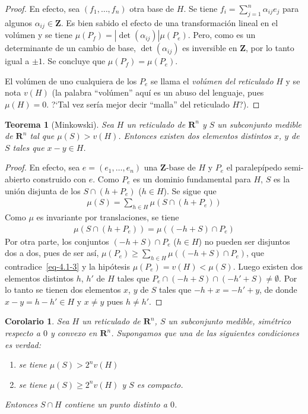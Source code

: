 \documentclass[10pt,oneside,bibtotoc,smallheadings,leqno,a5paper,DIV=12]{scrbook}
\newcommand{\RR}{\mathbf{R}}
\newcommand{\ZZ}{\mathbf{Z}}
\newcommand{\QED}{}%
\newcommand{\abs}[1]{\left\lvert#1\right\rvert}
\numberwithin{equation}{section}
\theoremstyle{defi}
\theoremstyle{enonce}
\newtheorem{theorem}{Teorema}
\newtheorem*{corollary*}{Corolario}
\theoremstyle{rem}
\numberwithin{theorem}{section}
\numberwithin{proposition}{section}
\numberwithin{definition}{section}
\numberwithin{lemma}{section}
\numberwithin{corollary}{section}
\numberwithin{example}{section}
\numberwithin{footnote}{section}%
\begin{document}
\begin{proof}
En efecto, sea $(f_{1},\dots,f_{n})$ otra base de $H$. Se tiene
$f_{i} = \sum_{j=1}^{n}\alpha_{ij}e_{j}$
para algunos $\alpha_{ij}\in\ZZ$. Es bien sabido el efecto de una transformaci\'on lineal
en el vol\'umen y
se tiene $\mu(P_{f}) = \abs{\det(\alpha_{ij})}\mu(P_{e})$. Pero, como es un determinante de
un cambio de base,
$\det(\alpha_{ij})$ es inversible en $\ZZ$, por lo tanto igual a $\pm 1$. Se concluye
que $\mu(P_{f}) = \mu(P_{e})$.

El vol\'umen de uno cualquiera de los $P_{e}$ se llama el {\em vol\'umen del reticulado} $H$
y se nota
$v(H)$ (la palabra ``vol\'umen'' aqu\'i es un abuso del lenguaje, pues $\mu(H) = 0$. ?`Tal
vez ser\'ia mejor decir ``malla'' del reticulado $H$?).
\end{proof}

\begin{theorem}[Minkowski]\label{teo4.1.2}
Sea $H$ un reticulado de $\RR^{n}$ y $S$ un subconjunto medible de $\RR^{n}$ tal
que $\mu(S) > v(H)$. Entonces existen
dos elementos distintos $x$, $y$ de $S$ tales que $x-y\in H$.
\end{theorem}

\begin{proof}
En efecto, sea $e = (e_{1},\dots,e_{n})$ una $\ZZ$-base de $H$ y $P_{e}$ el
paralep\'ipedo semi-abierto construido
con $e$. Como $P_{e}$ es un dominio fundamental para $H$, $S$ es la uni\'on disjunta de
los $S\cap (h+P_{e})$
($h\in H$). Se sigue que
\begin{gather}\label{eq-4.1-3}
\mu(S) = \sum_{h\in H}\mu(S\cap (h+P_{e}))
\end{gather}
Como $\mu$ es invariante por translaciones, se tiene
\begin{gather*}
\mu(S\cap (h+P_{e})) = \mu((-h+S)\cap P_{e})
\end{gather*}
Por otra parte, los conjuntos $(-h+S)\cap P_{e}$ ($h\in H$) no pueden ser disjuntos dos a
dos, pues de ser as\'i,
$\mu(P_{e})\geq\sum_{h\in H}\mu((-h+S)\cap P_{e})$, que contradice~\eqref{eq-4.1-3} y la
hip\'otesis $\mu(P_{e})=v(H)<\mu(S)$.
Luego existen dos elementos distintos $h$, $h'$ de $H$ tales que
$P_{e}\cap (-h+S)\cap (-h'+S)\neq\emptyset$.
Por lo tanto se tienen dos elementos $x$, $y$ de $S$ tales que $-h+x=-h'+y$, de donde
$x-y=h-h'\in H$ y
$x\neq y$ pues $h\neq h'$. \QED
\end{proof}

\begin{corollary*}
Sea $H$ un reticulado de $\RR^{n}$, $S$ un subconjunto medible, sim\'etrico respecto a
$0$ y convexo en $\RR^{n}$.
Supongamos que una de las siguientes condiciones es verdad:
\begin{enumerate}
\item[a)] se tiene $\mu(S) > 2^{n}v(H)$
\item[b)] se tiene $\mu(S)\geq 2^{n}v(H)$ y $S$ es compacto.
\end{enumerate}
Entonces $S\cap H$ contiene un punto distinto a $0$.
\end{corollary*}
\end{document}
